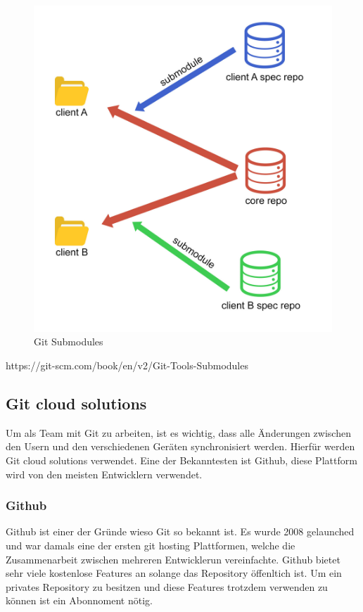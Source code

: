 \begin{figure}[h!]
    \centering
    \includegraphics[width=0.6\linewidth]{pics/git-submodules.jpg}
    \caption{Git Submodules}
    \label{fig:enter-label}
\end{figure}





https://git-scm.com/book/en/v2/Git-Tools-Submodules


\subsection{Git cloud solutions}

Um als Team mit Git zu arbeiten, ist es wichtig, dass alle Änderungen zwischen den Usern und den verschiedenen Geräten synchronisiert werden. Hierfür werden Git cloud solutions verwendet. Eine der Bekanntesten ist Github, diese Plattform wird von den meisten Entwicklern verwendet.

\subsubsection{Github}

Github ist einer der Gründe wieso Git so bekannt ist. Es wurde 2008 gelaunched und war damals eine der ersten git hosting Plattformen, welche die Zusammenarbeit zwischen mehreren Entwicklerun vereinfachte. Github bietet sehr viele kostenlose Features an solange das Repository öffenltich ist. Um ein privates Repository zu besitzen und diese Features trotzdem verwenden zu können ist ein Abonnoment nötig.

\cite{Github_1}
\cite{Github_2}